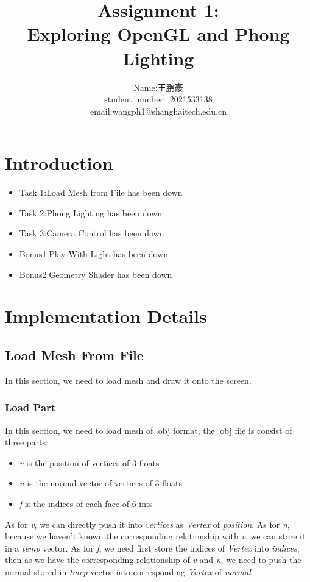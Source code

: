 \documentclass[acmtog]{acmart}
\title{Assignment 1:\\ {Exploring OpenGL and Phong Lighting}}
\author{Name:\quad 王鹏豪  \\ student number:\ 2021533138
\\email:\quad wangph1@shanghaitech.edu.cn}
\begin{document}
\maketitle

\vspace*{2 ex}

\section{Introduction}
\begin{itemize}
	\item Task 1:\quad Load Mesh from File has been down
	\item Task 2:\quad Phong Lighting has been down
	\item Task 3:\quad Camera Control has been down
	\item Bonus1:\quad Play With Light has been down
	\item Bonus2:\quad Geometry Shader has been down
\end{itemize}
\section{Implementation Details}
\subsection{Load Mesh From File}
	In this section, we need to load mesh and draw it onto the screen.
\subsubsection{Load Part}
	In this section, we need to load mesh of .obj format, the .obj file is consist of three parts:
	\begin{itemize}
		\item \emph{v} is the position of vertices of 3 floats
		\item \emph{n} is the normal vector of vertices of 3 floats
		\item \emph{f} is the indices of each face of 6 ints
	\end{itemize}
	As for \emph{v}, we can directly push it into \emph{vertices} as \emph{Vertex} of \emph{position}.
	As for \emph{n}, because we haven't known the corresponding relationship with \emph{v},
	we can store it in a \emph{temp} vector.
	As for \emph{f}, we need first store the indices of \emph{Vertex} into \emph{indices},
	then as we have the corresponding
	relationship of \emph{v} and \emph{n}, we need to push the normal
	stored in \emph{tmep} vector into corresponding \emph{Vertex} of \emph{normal}. 
\end{document}
